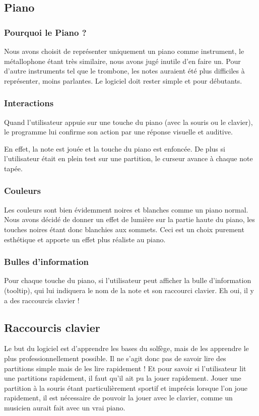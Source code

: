 \documentclass{article}
\begin{document}
\subsection{Piano}
\subsubsection{Pourquoi le Piano ?}
Nous avons choisit de représenter uniquement un piano comme instrument, le métallophone étant très similaire, nous avons
jugé inutile d'en faire un. Pour d'autre instruments tel que le trombone, les notes auraient été plus difficiles à représenter,
moins parlantes. Le logiciel doit rester simple et pour débutants.
\subsubsection{Interactions}
Quand l'utilisateur appuie sur une touche du piano (avec la souris ou le clavier),
le programme lui confirme son action par une réponse visuelle et auditive.


En effet, la note est jouée et la touche du piano est enfoncée. De plus si l'utilisateur était en plein test sur une partition,
le curseur avance à chaque note tapée.
\subsubsection{Couleurs}
Les couleurs sont bien évidemment noires et blanches comme un piano normal. Nous avons décidé de donner un effet de lumière 
sur la partie haute du piano, les touches noires étant donc blanchies aux sommets. Ceci est un choix purement esthétique et 
apporte un effet plus réaliste au piano.
\subsubsection{Bulles d'information}
Pour chaque touche du piano, si l'utilisateur peut afficher la bulle d'information (tooltip), qui lui indiquera le nom de la 
note et son raccourci clavier. Eh oui, il y a des raccourcis clavier !
\subsection{Raccourcis clavier}
Le but du logiciel est d'apprendre les bases du solfège, mais de les apprendre le plus professionnellement possible.
Il ne s’agit donc pas de savoir lire des partitions simple mais de les lire rapidement !
Et pour savoir si l'utilisateur lit une partitions rapidement, il faut qu'il ait pu la jouer rapidement.
Jouer une partition à la souris étant particulièrement sportif et imprécis lorsque l'on joue rapidement, il est nécessaire
de pouvoir la jouer avec le clavier, comme un musicien aurait fait avec un vrai piano.
\end{document}
